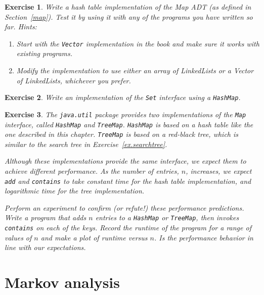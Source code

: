 \documentclass[12pt]{book}
\theoremstyle{exercise}
\newtheorem{exercise}{Exercise}[chapter]
\begin{document}
\begin{exercise}
Write a hash table implementation of the Map ADT (as defined in
Section~\ref{map}).  Test it by using it with any of the programs
you have written so far.  Hints:

\begin{enumerate}

\item Start with the {\tt Vector} implementation in the book
and make sure it works with existing programs.

\item Modify the implementation to use either an array of
LinkedLists or a Vector of LinkedLists, whichever you prefer.

\end{enumerate}
\end{exercise}


\begin{exercise}
Write an implementation of the {\tt Set} interface using a
{\tt HashMap}.
\end {exercise}


\begin{exercise}

The {\tt java.util} package provides two implementations of the
{\tt Map} interface, called {\tt HashMap} and {\tt TreeMap}.
{\tt HashMap} is based on a hash table like the one described
in this chapter.  {\tt TreeMap} is based on a red-black tree, which
is similar to the search tree in Exercise~\ref{ex.searchtree}.

Although these implementations provide the same interface, we
expect them to achieve different performance.  As the number of
entries, $n$, increases, we expect {\tt add} and {\tt contains}
to take constant time for the hash table implementation, and
logarithmic time for the tree implementation.

Perform an experiment to confirm (or refute!) these performance
predictions.  Write a program that adds $n$ entries to a 
{\tt HashMap} or {\tt TreeMap}, then invokes {\tt contains} on
each of the keys.  Record the runtime of the program for a range
of values of $n$ and make a plot of runtime versus $n$.  Is
the performance behavior in line with our expectations.
\end {exercise}


\chapter{Markov analysis}
\label{markov}
\end{document}
